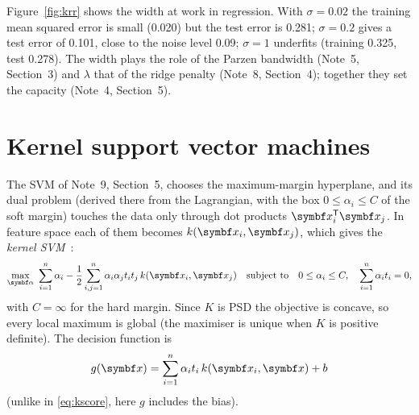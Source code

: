 \documentclass[11pt]{article}
\newcommand{\valpha}{\vect{\alpha}}
\begin{document}
Figure~\ref{fig:krr} shows the width at work in regression. With $\sigma = 0.02$ the training mean squared error is small (0.020) but
the test error is 0.281; $\sigma = 0.2$ gives a test error of 0.101, close to the noise level 0.09; $\sigma = 1$ underfits
(training 0.325, test 0.278). The width plays the role of the Parzen bandwidth (Note~5, Section~3) and $\lambda$ that of
the ridge penalty (Note~8, Section~4); together they set the capacity (Note~4, Section~5).

\section{Kernel support vector machines}\label{sec:ksvm}

The SVM of Note~9, Section~5, chooses the maximum-margin hyperplane, and its dual problem (derived there from the
Lagrangian, with the box $0 \le \alpha_i \le C$ of the soft margin) touches the data only through dot products $\x_i\T\x_j$.
In feature space each of them becomes $k(\x_i, \x_j)$, which gives the \emph{kernel SVM}~\cite{boser1992,cortes1995}:
\begin{equation}\label{eq:dual}
  \max_{\valpha}\ \sum_{i=1}^n \alpha_i - \frac12\sum_{i,j=1}^n \alpha_i\alpha_j t_it_j\, k(\x_i, \x_j)
  \quad\text{subject to}\quad 0 \le \alpha_i \le C, \quad \sum_{i=1}^n \alpha_i t_i = 0,
\end{equation}
with $C = \infty$ for the hard margin. Since $K$ is PSD the objective is concave, so every local maximum is global (the
maximiser is unique when $K$ is positive definite). The decision function is
\begin{equation}\label{eq:svmdec}
  g(\x) = \sum_{i=1}^n \alpha_i t_i\, k(\x_i, \x) + b
\end{equation}
(unlike in \eqref{eq:kscore}, here $g$ includes the bias).
\end{document}
